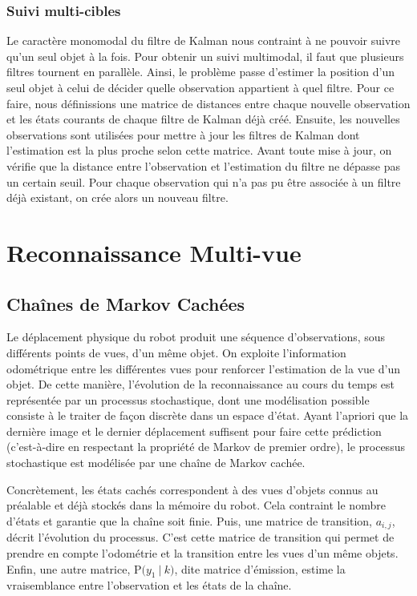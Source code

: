 \subsubsection{Suivi multi-cibles}
Le caractère monomodal du filtre de Kalman nous contraint à ne pouvoir suivre qu'un seul objet à la fois. Pour obtenir un suivi multimodal, il faut que plusieurs filtres tournent en parallèle. Ainsi, le problème passe d’estimer la position d'un seul objet à celui de décider quelle observation appartient à quel filtre. Pour ce faire, nous définissions une matrice de distances entre chaque nouvelle observation et les états courants de chaque filtre de Kalman déjà créé.
Ensuite, les nouvelles observations sont utilisées pour mettre à jour les filtres de Kalman dont l'estimation est la plus proche selon cette matrice. Avant toute mise à jour, on vérifie que la distance entre l'observation et l'estimation du filtre ne dépasse pas un certain seuil. Pour chaque observation qui n'a pas pu être associée à un filtre déjà existant, on crée alors un nouveau filtre.

\section {Reconnaissance Multi-vue}

\subsection {Chaînes de Markov Cachées}

Le déplacement physique du robot produit une séquence
d'observations, sous différents points de vues, d'un même objet. On exploite
l'information odométrique entre les différentes vues pour renforcer l'estimation de la vue d'un objet. De cette manière, l'évolution de la
reconnaissance au cours du temps est représentée par un processus
stochastique, dont une modélisation possible consiste à le traiter
de façon discrète dans un espace d'état. Ayant l'apriori que la
dernière image et le dernier déplacement suffisent pour faire cette
prédiction (c'est-à-dire en respectant la propriété de Markov de premier
ordre), le processus stochastique est modélisée par une
chaîne de Markov cachée.

Concrètement, les états cachés correspondent à des vues d'objets connus au
préalable et déjà stockés dans la mémoire du robot. Cela contraint le
nombre d'états et garantie que la chaîne soit finie. Puis, une
matrice de transition, $a_{i,j}$, décrit l'évolution du processus. C'est cette matrice de transition qui permet de prendre en compte l'odométrie et la transition entre les vues d'un même objets. Enfin, une autre matrice, $\mathrm{P}\big( y_1 \ | \ k \big)$, dite matrice d'émission, estime la vraisemblance entre l'observation
et les états de la chaîne.

